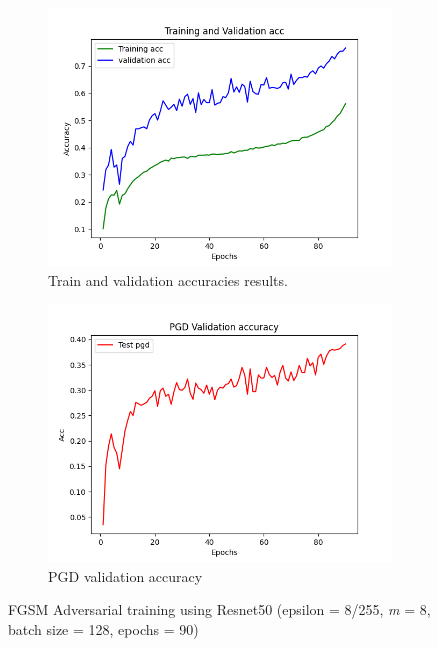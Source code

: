 \documentclass{article}
\begin{document}
\begin{figure}[hbt!]
  \centering
  \begin{subfigure}[b]{0.4\linewidth}
    \includegraphics[width=\linewidth]{images/FastResnet/Figure_2.png}
    \caption{ Train and validation accuracies results.}
  \end{subfigure}
  \begin{subfigure}[b]{0.4\linewidth}
    \includegraphics[width=\linewidth]{images/FastResnet/Figure_5.png}
    \caption{PGD validation accuracy}
  \end{subfigure}
  \caption{FGSM Adversarial training using Resnet50 (epsilon = 8/255, \textit{m} = 8, batch size = 128, epochs = 90)}
  \label{fig:coffee}
\end{figure}
\end{document}
